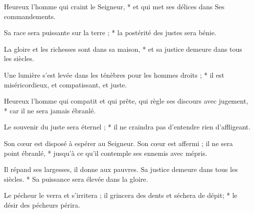 \item Heureux l'homme qui craint le Seigneur, * et qui met ses délices dans Ses commandements.
\item Sa race sera puissante sur la terre ; * la postérité des justes sera bénie.
\item La gloire et les richesses sont dans sa maison, * et sa justice demeure dans tous les siècles.
\item Une lumière s'est levée dans les ténèbres pour les hommes droits ; * il est miséricordieux, et compatissant, et juste.
\item Heureux l'homme qui compatit et qui prête, qui règle ses discours avec jugement, * car il ne sera jamais ébranlé.
\item Le souvenir du juste sera éternel ; * il ne craindra pas d'entendre rien d'affligeant.
\item Son cœur est disposé à espérer au Seigneur. Son cœur est affermi ; il ne sera point ébranlé, * jusqu'à ce qu'il contemple ses ennemis avec mépris.
\item Il répand ses largesses, il donne aux pauvres. Sa justice demeure dans tous les siècles. * Sa puissance sera élevée dans la gloire.
\item Le pécheur le verra et s'irritera ; il grincera des dents et séchera de dépit; * le désir des pécheurs périra.
